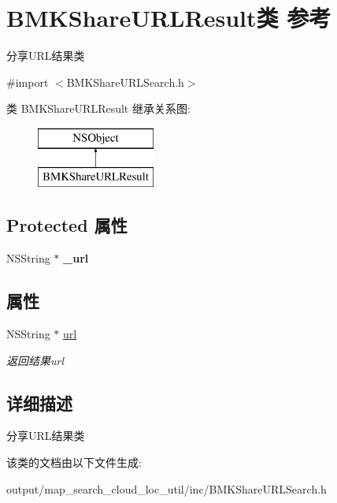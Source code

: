 \hypertarget{interface_b_m_k_share_u_r_l_result}{\section{B\+M\+K\+Share\+U\+R\+L\+Result类 参考}
\label{interface_b_m_k_share_u_r_l_result}
}


分享\+U\+R\+L结果类  




{\ttfamily \#import $<$B\+M\+K\+Share\+U\+R\+L\+Search.\+h$>$}

类 B\+M\+K\+Share\+U\+R\+L\+Result 继承关系图\+:\begin{figure}[H]
\begin{center}
\leavevmode
\includegraphics[height=2.000000cm]{interface_b_m_k_share_u_r_l_result}
\end{center}
\end{figure}
\subsection*{Protected 属性}
\begin{DoxyCompactItemize}
\item 
\hypertarget{interface_b_m_k_share_u_r_l_result_ae6060f2c0da5559f27d001b81b703149}{N\+S\+String $\ast$ {\bfseries \+\_\+url}}\label{interface_b_m_k_share_u_r_l_result_ae6060f2c0da5559f27d001b81b703149}

\end{DoxyCompactItemize}
\subsection*{属性}
\begin{DoxyCompactItemize}
\item 
\hypertarget{interface_b_m_k_share_u_r_l_result_aab32f03a7af14ad74e61dcc24e4c9554}{N\+S\+String $\ast$ \hyperlink{interface_b_m_k_share_u_r_l_result_aab32f03a7af14ad74e61dcc24e4c9554}{url}}\label{interface_b_m_k_share_u_r_l_result_aab32f03a7af14ad74e61dcc24e4c9554}

\begin{DoxyCompactList}\small\item\em 返回结果url \end{DoxyCompactList}\end{DoxyCompactItemize}


\subsection{详细描述}
分享\+U\+R\+L结果类 

该类的文档由以下文件生成\+:\begin{DoxyCompactItemize}
\item 
output/map\+\_\+search\+\_\+cloud\+\_\+loc\+\_\+util/inc/B\+M\+K\+Share\+U\+R\+L\+Search.\+h\end{DoxyCompactItemize}

